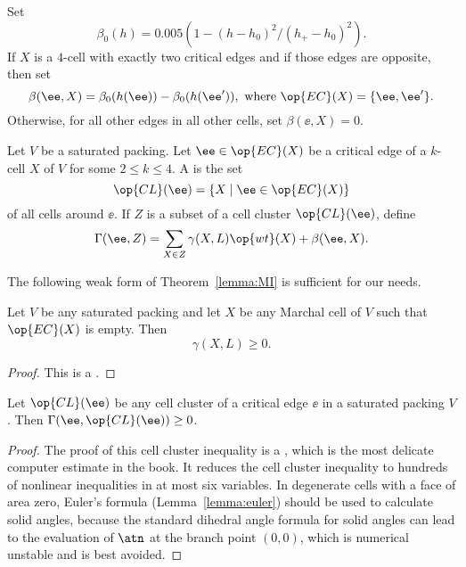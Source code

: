 \begin{definition}\label{def:beta} 
Set 
\[  
\beta_0(h) = 0.005 (1 - (h-h_0)^2/(h_+-h_0)^2).
\] 
If $X$ is a $4$-cell with exactly two critical edges and if those
edges are opposite, then set
\[  
\beta(\ee,X) = \beta_0(h(\ee)) - \beta_0(h(\ee')), 
\text{ where }\op{EC}(X) = \{\ee,\ee'\} .  
\] 
Otherwise, for all other edges in all other cells, set $\beta(\ee,X) = 0$.
\end{definition}
%
%

\pqfexqn

\begin{definition}
\label{def:gammaL} 
  Let $V$ be a saturated packing.  Let $\ee\in \op{EC}(X)$ be a
  critical edge of a $k$-cell $X$ of $V$ for some $2\le k\le 4$.  A
   is the set
\[  
\op{CL}(\ee) = \{X\mid \ee\in \op{EC}(X)\} 
\] 
%
of all cells around $\ee$. 
If $Z$ is a subset of a cell cluster $\op{CL}(\ee)$, define
%
\[  
\Gamma(\ee,Z) = \sum_{X\in Z} \gamma(X,L) \op{wt}(X) +\beta(\ee,X).
\] 
%
\end{definition}
%

The following weak form of Theorem~\ref{lemma:MI} is sufficient
for our needs.

\begin{lemma}\label{lemma:LI} 
Let $V$ be any saturated packing and let $X$ be any Marchal cell of $V$ such that $\op{EC}(X)$ is empty.   Then
\[
\gamma(X,L)\ge 0.
\]
\end{lemma}

\begin{proof} This is a .
\end{proof}


\begin{theorem} 
\label{lemma:cluster}
Let $\op{CL}(\ee)$ be any cell cluster of a critical edge $\ee$ in a
saturated packing $V$.  Then $\Gamma(\ee,\op{CL}(\ee))\ge 0$.
\end{theorem}

\begin{proof}
  The proof of this cell cluster inequality is a , which
  is the most delicate computer estimate in the book.  It 
  reduces the cell cluster inequality to hundreds of nonlinear
  inequalities in at most six variables.  In degenerate cells with a
  face of area zero, Euler's formula (Lemma~\ref{lemma:euler}) should
  be used to calculate solid angles, because the standard dihedral angle
  formula for solid angles can lead to the evaluation of $\atn$ at the
  branch point $(0,0)$, which is numerical unstable and is best
  avoided.
\end{proof}

